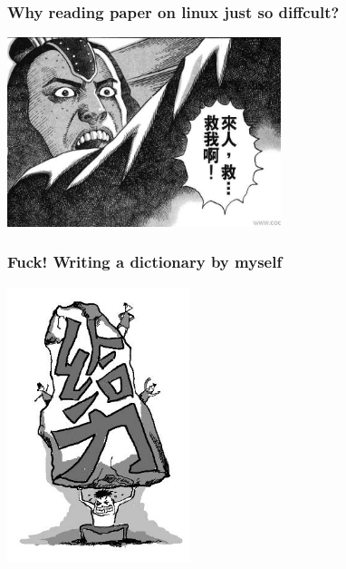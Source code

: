 \documentclass[10pt]{beamer}
\begin{document}
\begin{frame}
  \frametitle{Why reading paper on linux just so diffcult?}

\begin{center} 
  \includegraphics[width=0.6\textwidth]{help.jpg}
\end{center}

\end{frame}

\begin{frame}
  \frametitle{Fuck! Writing a dictionary by myself}
 
\begin{center} 
  \includegraphics[width=0.4\textwidth]{geili.jpg}
  
\end{center}

\end{frame}
\end{document}
